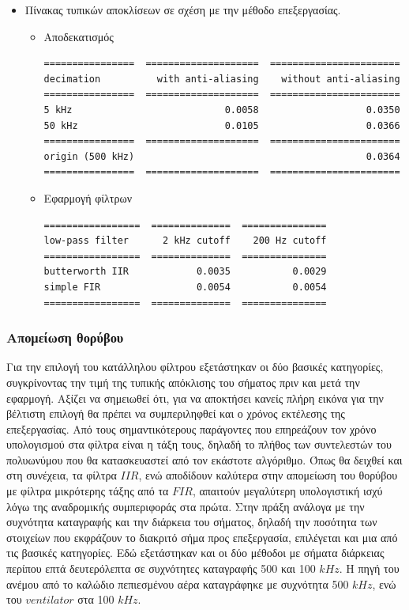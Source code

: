 \documentclass[breaklines=true, 12pt]{article}
\begin{document}
\begin{enumerate}
\begin{itemize}
\item Πίνακας τυπικών αποκλίσεων σε σχέση με την μέθοδο επεξεργασίας.
\begin{itemize}
\item Αποδεκατισμός
\begin{verbatim}
================  ====================  =======================
decimation          with anti-aliasing    without anti-aliasing
================  ====================  =======================
5 kHz                           0.0058                   0.0350
50 kHz                          0.0105                   0.0366
================  ====================  =======================
origin (500 kHz)                                         0.0364
================  ====================  =======================
\end{verbatim}
\end{itemize}
\begin{itemize}
\item Εφαρμογή φίλτρων
\begin{verbatim}
=================  ==============  ===============
low-pass filter      2 kHz cutoff    200 Hz cutoff
=================  ==============  ===============
butterworth IIR            0.0035           0.0029
simple FIR                 0.0054           0.0054
=================  ==============  ===============
\end{verbatim}
\end{itemize}

\end{itemize}
\end{enumerate}
\subsubsection{Απομείωση θορύβου}
\label{sec:org9579c86}
Για την επιλογή του κατάλληλου φίλτρου εξετάστηκαν οι δύο βασικές
κατηγορίες, συγκρίνοντας την τιμή της τυπικής απόκλισης του σήματος πριν
και μετά την εφαρμογή. Αξίζει να σημειωθεί ότι, για να αποκτήσει κανείς
πλήρη εικόνα για την βέλτιστη επιλογή θα πρέπει να συμπεριληφθεί και ο
χρόνος εκτέλεσης της επεξεργασίας. Από τους σημαντικότερους παράγοντες
που επηρεάζουν τον χρόνο υπολογισμού στα φίλτρα είναι η τάξη τους, δηλαδή
το πλήθος των συντελεστών του πολυωνύμου που θα κατασκευαστεί από τον
εκάστοτε αλγόριθμο. Όπως θα δειχθεί και στη συνέχεια, τα φίλτρα \(IIR\), ενώ
αποδίδουν καλύτερα στην απομείωση του θορύβου με φίλτρα μικρότερης τάξης
από τα \(FIR\), απαιτούν μεγαλύτερη υπολογιστική ισχύ λόγω της αναδρομικής
συμπεριφοράς στα πρώτα. Στην πράξη ανάλογα με την συχνότητα καταγραφής και
την διάρκεια του σήματος, δηλαδή την ποσότητα των στοιχείων που εκφράζουν
το διακριτό σήμα προς επεξεργασία, επιλέγεται και μια από τις βασικές
κατηγορίες. Εδώ εξετάστηκαν και οι δύο μέθοδοι με σήματα διάρκειας περίπου
επτά δευτερόλεπτα σε συχνότητες καταγραφής 500 και 100 \(kHz\). Η πηγή του
ανέμου από το καλώδιο πεπιεσμένου αέρα καταγράφηκε με συχνότητα 500 \(kHz\),
ενώ του \textbf{\(ventilator\)} στα 100 \(kHz\).
\end{document}

